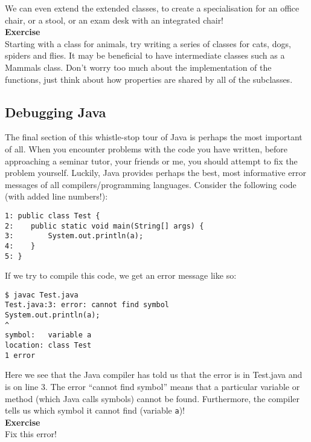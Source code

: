 \noindent
We can even extend the extended classes, to create a specialisation for an office chair, or a stool, or an exam desk with an integrated chair!\\

\noindent
{\bf Exercise}\\

\noindent
Starting with a class for animals, try writing a series of classes for cats, dogs, spiders and flies. It may be beneficial to have intermediate classes such as a Mammals class. Don't worry too much about the implementation of the functions, just think about how properties are shared by all of the subclasses.

\subsection{Debugging Java}

The final section of this whistle-stop tour of Java is perhaps the most important of all. When you encounter problems with the code you have written, before approaching a seminar tutor, your friends or me, you should attempt to fix the problem yourself. Luckily, Java provides perhaps the best, most informative error messages of all compilers/programming languages. Consider the following code (with added line numbers!):

\begin{verbatim}
1: public class Test {
2:    public static void main(String[] args) {
3:        System.out.println(a);
4:    }
5: }
\end{verbatim}

\noindent
If we try to compile this code, we get an error message like so:

\begin{verbatim}
$ javac Test.java
Test.java:3: error: cannot find symbol
System.out.println(a);
^
symbol:   variable a
location: class Test
1 error
\end{verbatim}

\noindent
Here we see that the Java compiler has told us that the error is in Test.java and is on line 3. The error ``cannot find symbol'' means that a particular variable or method (which Java calls symbols) cannot be found. Furthermore, the compiler tells us which symbol it cannot find (variable {\tt a})!\\

\noindent
{\bf Exercise}\\

\noindent
Fix this error!\\

